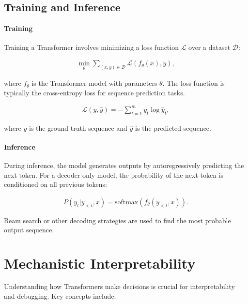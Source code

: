 \subsection{Training and Inference}\label{subsec:training_inference}


\paragraph{Training}

Training a Transformer involves minimizing a loss function $\mathcal{L}$ over a dataset $\mathcal{D}$:

\begin{align}
    \min_{\theta} \sum_{(x, y) \in \mathcal{D}} \mathcal{L}(f_\theta(x), y),
\end{align}

where $f_\theta$ is the Transformer model with parameters $\theta$. The loss function is typically the cross-entropy loss for sequence prediction tasks.

\begin{align}
    \mathcal{L}(y, \hat{y}) = -\sum_{t=1}^{m} y_t \log \hat{y}_t,
\end{align}

where $y$ is the ground-truth sequence and $\hat{y}$ is the predicted sequence.

\paragraph{Inference}

During inference, the model generates outputs by autoregressively predicting the next token. For a decoder-only model, the probability of the next token is conditioned on all previous tokens:

\begin{align}
    P(y_t | y_{<t}, x) = \text{softmax}(f_\theta(y_{<t}, x)).
\end{align}

Beam search or other decoding strategies are used to find the most probable output sequence.

\section{Mechanistic Interpretability}\label{sec:mech_interp}


Understanding how Transformers make decisions is crucial for interpretability and debugging. Key concepts include:


